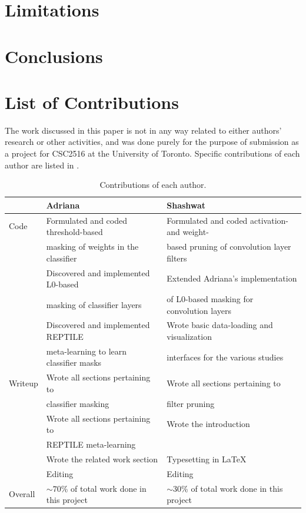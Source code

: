\documentclass{article}
\begin{document}
\section{Limitations}


\section{Conclusions}


\section{List of Contributions}

The work discussed in this paper is not in any way related to either authors' research or other activities, and was done purely for the purpose of submission as a project for CSC2516 at the University of Toronto. Specific contributions of each author are listed in .

\begin{table}[!h]
	\centering
	\caption{Contributions of each author.}
	\begin{tabular}{lll}
		\toprule
		& Adriana & Shashwat \\
		\midrule
		Code & Formulated and coded threshold-based & Formulated  and coded activation- and weight- \\
		& masking of weights in the classifier & based pruning of convolution layer filters \\[2mm]
		& Discovered and implemented L0-based & Extended Adriana's implementation \\
		& masking of classifier layers & of L0-based masking for convolution layers \\[2mm]
		& Discovered and implemented REPTILE & Wrote basic data-loading and visualization \\
		& meta-learning to learn classifier masks & interfaces for the various studies \\[2mm]
		Writeup & Wrote all sections pertaining to & Wrote all sections pertaining to \\
		& classifier masking & filter pruning\\[2mm]
		& Wrote all sections pertaining to & Wrote the introduction \\
		& REPTILE meta-learning & \\[2mm]
		& Wrote the related work section & Typesetting in \LaTeX \\[2mm]
		& Editing & Editing \\[2mm]
		Overall & $\sim 70$\% of total work done in this project & $\sim 30$\% of total work done in this project \\
		\bottomrule
	\end{tabular}
	\label{contr}
\end{table}
\end{document}
